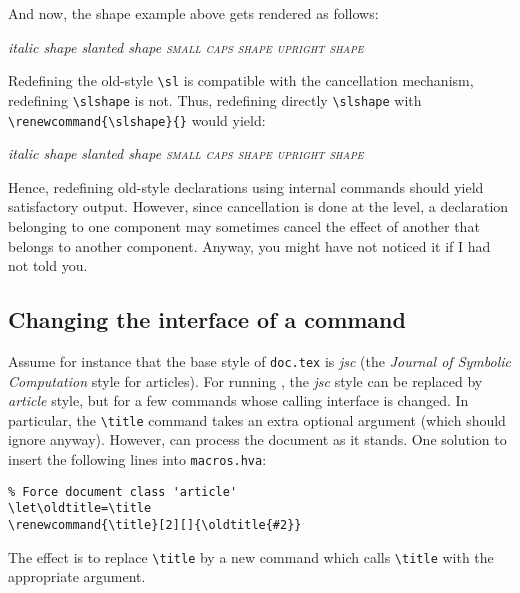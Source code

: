 \begin{htmlonly}
And now, the shape example above gets rendered as follows:
\begin{htmlout}\renewcommand{\sl}{\@span{style="font-family:Helvetica"}}
{\itshape italic shape \slshape slanted shape
\scshape small caps shape \upshape upright shape}
\end{htmlout}

Redefining the old-style \verb+\sl+ is compatible with the cancellation
mechanism, redefining \verb+\slshape+ is not.
Thus, redefining directly \LaTeXe{} \verb+\slshape+ with
\verb+\renewcommand{\slshape}{}+ would yield:
\begin{htmlout}\renewcommand{\slshape}{}
{\itshape italic shape \slshape slanted shape
\scshape small caps shape \upshape upright shape}
\end{htmlout}
\end{htmlonly}

Hence, redefining old-style declarations using internal commands
should yield satisfactory output.
However, since cancellation is done at the \html{}
level, a declaration belonging to one component may sometimes cancel the
effect of another that belongs to another component.
Anyway, you might have not noticed it if I had not told you.

\subsection{Changing the interface of a command}\label{customize-let}
Assume for instance that the base style of \texttt{doc.tex} is
\textit{jsc} (the
\emph{Journal of Symbolic Computation} style for articles).
For running \hevea{}, the \textit{jsc} style can be replaced by
\textit{article}
style, but for a few commands whose calling interface is changed.
In particular, the \verb+\title+ command
takes an extra optional argument (which \hevea{} should ignore
anyway).
However, \hevea{} can process the document as it stands.
One  solution to insert the following lines into \texttt{macros.hva}:
\begin{verbatim}
% Force document class 'article'
\let\oldtitle=\title
\renewcommand{\title}[2][]{\oldtitle{#2}}
\end{verbatim}
The effect is to replace \verb+\title+ by a new command which
calls \hevea{} \verb+\title+ with the appropriate argument.
